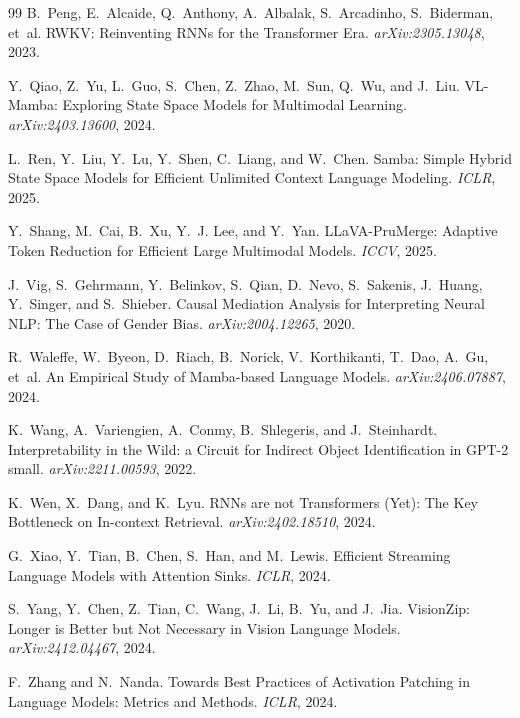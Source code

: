 \begin{thebibliography}{99}
B.~Peng, E.~Alcaide, Q.~Anthony, A.~Albalak, S.~Arcadinho, S.~Biderman, et~al.
\newblock RWKV: Reinventing RNNs for the Transformer Era.
\emph{arXiv:2305.13048}, 2023.

Y.~Qiao, Z.~Yu, L.~Guo, S.~Chen, Z.~Zhao, M.~Sun, Q.~Wu, and J.~Liu.
\newblock VL-Mamba: Exploring State Space Models for Multimodal Learning.
\emph{arXiv:2403.13600}, 2024.

L.~Ren, Y.~Liu, Y.~Lu, Y.~Shen, C.~Liang, and W.~Chen.
\newblock Samba: Simple Hybrid State Space Models for Efficient Unlimited
Context Language Modeling. \emph{ICLR}, 2025.

Y.~Shang, M.~Cai, B.~Xu, Y.~J. Lee, and Y.~Yan.
\newblock LLaVA-PruMerge: Adaptive Token Reduction for Efficient Large
Multimodal Models. \emph{ICCV}, 2025.

J.~Vig, S.~Gehrmann, Y.~Belinkov, S.~Qian, D.~Nevo, S.~Sakenis, J.~Huang,
Y.~Singer, and S.~Shieber.
\newblock Causal Mediation Analysis for Interpreting Neural NLP: The Case of
Gender Bias. \emph{arXiv:2004.12265}, 2020.

R.~Waleffe, W.~Byeon, D.~Riach, B.~Norick, V.~Korthikanti, T.~Dao, A.~Gu,
et~al.
\newblock An Empirical Study of Mamba-based Language Models.
\emph{arXiv:2406.07887}, 2024.

K.~Wang, A.~Variengien, A.~Conmy, B.~Shlegeris, and J.~Steinhardt.
\newblock Interpretability in the Wild: a Circuit for Indirect Object
Identification in GPT-2 small. \emph{arXiv:2211.00593}, 2022.

K.~Wen, X.~Dang, and K.~Lyu.
\newblock RNNs are not Transformers (Yet): The Key Bottleneck on In-context
Retrieval. \emph{arXiv:2402.18510}, 2024.

G.~Xiao, Y.~Tian, B.~Chen, S.~Han, and M.~Lewis.
\newblock Efficient Streaming Language Models with Attention Sinks.
\emph{ICLR}, 2024.

S.~Yang, Y.~Chen, Z.~Tian, C.~Wang, J.~Li, B.~Yu, and J.~Jia.
\newblock VisionZip: Longer is Better but Not Necessary in Vision Language
Models. \emph{arXiv:2412.04467}, 2024.

F.~Zhang and N.~Nanda.
\newblock Towards Best Practices of Activation Patching in Language Models:
Metrics and Methods. \emph{ICLR}, 2024.


\end{thebibliography}
